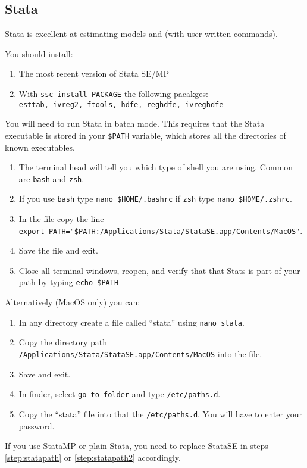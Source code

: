 \subsection{Stata}

Stata is excellent at estimating models and (with user-written commands).

You should install:
\begin{enumerate}
	\item The most recent version of Stata SE/MP
	\item With \texttt{ssc install PACKAGE} the following pacakges: \\ \texttt{esttab, ivreg2, ftools, hdfe, reghdfe, ivreghdfe}
\end{enumerate}

You will need to run Stata in batch mode. This requires that the Stata executable is stored in your \texttt{\$PATH} variable, which stores all the directories of known executables.
\begin{enumerate}
	\item The terminal head will tell you which type of shell you are using. Common are \texttt{bash} and \texttt{zsh}.
	\item If you use \texttt{bash} type \texttt{nano \$HOME/.bashrc} if \texttt{zsh} type \texttt{nano \$HOME/.zshrc}.
	\item\label{step:statapath} In the file copy the line \\ \texttt{export PATH="\$PATH:/Applications/Stata/StataSE.app/Contents/MacOS"}.
	\item Save the file and exit.
	\item Close all terminal windows, reopen, and verify that that Stats is part of your path by typing \texttt{echo \$PATH}
\end{enumerate}

Alternatively (MacOS only) you can:
\begin{enumerate}
	\item In any directory create a file called ``stata'' using \texttt{nano stata}.
	\item\label{step:statapath2} Copy the directory path \texttt{/Applications/Stata/StataSE.app/Contents/MacOS} into the file.
	\item Save and exit.
	\item In finder, select \texttt{go to folder} and type \texttt{/etc/paths.d}.
	\item Copy the ``stata'' file into that the \texttt{/etc/paths.d}. You will have to enter your password.
\end{enumerate}

If you use StataMP or plain Stata, you need to replace StataSE in steps \ref{step:statapath} or \ref{step:statapath2} accordingly.

